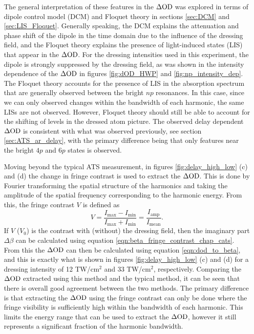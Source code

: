 The general interpretation of these features in the $\Delta\mathrm{OD}$ was explored in terms of dipole control model (DCM) and Floquet theory in sections \ref{sec:DCM} and \ref{sec:LIS_Floquet}.  Generally speaking, the DCM explains the attenuation and phase shift of the dipole in the time domain due to the influence of the dressing field, and the Floquet theory explains the presence of light-induced states (LIS) that appear in the $\Delta\mathrm{OD}$.  For the dressing intensities used in this experiment, the dipole is strongly suppressed by the dressing field, as was shown in the intensity dependence of the $\Delta\mathrm{OD}$ in figures \ref{fig:dOD_HWP} and \ref{fig:np_intensity_dep}.  The Floquet theory accounts for the presence of LIS in the absorption spectrum that are generally observed between the bright $np$ resonances.  In this case, since we can only observed changes within the bandwidth of each harmonic, the same LISs are not observed.  However, Floquet theory should still be able to account for the shifting of levels in the dressed atom picture.  The observed delay dependent $\Delta\mathrm{OD}$ is consistent with what was observed previously, see section \ref{sec:ATS_ar_delay}, with the primary difference being that only features near the bright $4p$ and $6p$ states is observed.

Moving beyond the typical ATS measurement, in figures \ref{fig:delay_high_low} (c) and (d) the change in fringe contrast is used to extract the $\Delta\mathrm{OD}$.  This is done by Fourier transforming the spatial structure of the harmonics and taking the amplitude of the spatial frequency corresponding to the harmonic energy.  From this, the fringe contrast $V$ is defined as
\begin{equation}
	V=\frac{I_{\mathrm{max}} - I_{\mathrm{min}}}{I_{\mathrm{max}} + I_{\mathrm{min}}} = \frac{I_{\mathrm{amp}}}{I_{\mathrm{mean}}}.
\end{equation}
If $V$ ($V_0$) is the contrast with (without) the dressing field, then the imaginary part $\Delta\beta$ can be calculated using equation \ref{eqn:beta_fringe_contrast_chap_cats}.  From this the $\Delta\mathrm{OD}$ can then be calculated using equation \ref{eqn:dod_to_beta}, and this is exactly what is shown in figures \ref{fig:delay_high_low} (c) and (d) for a dressing intensity of 12 TW/cm$^2$ and 33 TW/cm$^2$, respectively.  Comparing the $\Delta\mathrm{OD}$ extracted using this method and the typical method, it can be seen that there is overall good agreement between the two methods.  The primary difference is that extracting the $\Delta\mathrm{OD}$ using the fringe contrast can only be done where the fringe visibility is sufficiently high within the bandwidth of each harmonic.  This limits the energy range that can be used to extract the $\Delta\mathrm{OD}$, however it still represents a significant fraction of the harmonic bandwidth.


